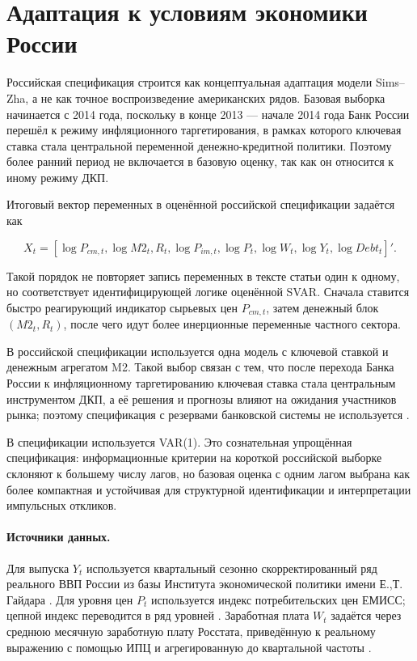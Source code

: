 \section{Адаптация к условиям экономики России}
Российская спецификация строится как концептуальная адаптация модели Sims--Zha, а не как точное воспроизведение американских рядов. Базовая выборка начинается с 2014 года, поскольку в конце 2013 --- начале 2014 года Банк России перешёл к режиму инфляционного таргетирования, в рамках которого ключевая ставка стала центральной переменной денежно-кредитной политики. Поэтому более ранний период не включается в базовую оценку, так как он относится к иному режиму ДКП.

Итоговый вектор переменных в оценённой российской спецификации задаётся как

$$
X_t =
\left[
\log P_{cm,t},
\log M2_t,
R_t,
\log P_{im,t},
\log P_t,
\log W_t,
\log Y_t,
\log Debt_t
\right]'.
$$

Такой порядок не повторяет запись переменных в тексте статьи один к одному, но соответствует идентифицирующей логике оценённой SVAR. Сначала ставится быстро реагирующий индикатор сырьевых цен $P_{cm,t}$, затем денежный блок $(M2_t, R_t)$, после чего идут более инерционные переменные частного сектора.

В российской спецификации используется одна модель с ключевой ставкой и денежным агрегатом M2. Такой выбор связан с тем, что после перехода Банка России к инфляционному таргетированию ключевая ставка стала центральным инструментом ДКП, а её решения и прогнозы влияют на ожидания участников рынка; поэтому спецификация с резервами банковской системы не используется \cite{tishin2019monetary,abdurakhmanov2023keyrate}.

В спецификации используется VAR(1). Это сознательная упрощённая спецификация: информационные критерии на короткой российской выборке склоняют к большему числу лагов, но базовая оценка с одним лагом выбрана как более компактная и устойчивая для структурной идентификации и интерпретации импульсных откликов.

\paragraph{Источники данных.}
Для выпуска $Y_t$ используется квартальный сезонно скорректированный ряд реального ВВП России из базы Института экономической политики имени Е.,Т. Гайдара \cite{iep_gdp_sa}. Для уровня цен $P_t$ используется индекс потребительских цен ЕМИСС; цепной индекс переводится в ряд уровней \cite{fedstat_cpi_31074}. Заработная плата $W_t$ задаётся через среднюю месячную заработную плату Росстата, приведённую к реальному выражению с помощью ИПЦ и агрегированную до квартальной частоты \cite{rosstat_short_term_indicators}.

